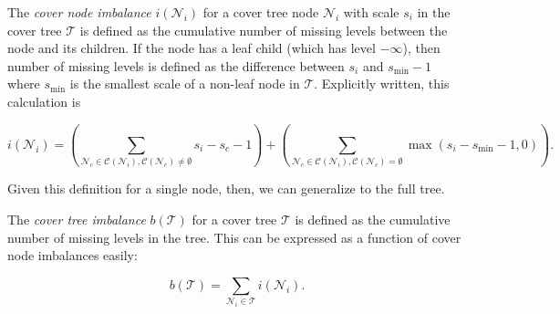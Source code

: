 \begin{defn}
The {\it cover node imbalance} $i(\mathscr{N}_i)$ for a cover tree node
$\mathscr{N}_i$ with scale $s_i$ in the cover tree $\mathscr{T}$ is defined as
the cumulative number of missing levels between the node and its children.  If
the node has a leaf child (which has level $-\infty$), then number of missing
levels is defined as the difference between $s_i$ and $s_{\min} - 1$ where
$s_{\min}$ is the smallest scale of a non-leaf node in $\mathscr{T}$.
Explicitly written, this calculation is

\begin{equation}
i(\mathscr{N}_i) = \left( \sum_{\mathscr{N}_c \in \mathscr{C}(\mathscr{N}_i),
\mathscr{C}(\mathscr{N}_c) \ne \emptyset} s_i - s_c - 1 \right) + \left(
\sum_{\mathscr{N}_c \in \mathscr{C}(\mathscr{N}_i), \mathscr{C}(\mathscr{N}_c) =
\emptyset} \max(s_i - s_{\min} - 1, 0) \right).
\end{equation}
\end{defn}

Given this definition for a single node, then, we can generalize to the full
tree.

\begin{defn}
The {\it cover tree imbalance} $b(\mathscr{T})$ for a cover tree $\mathscr{T}$
is defined as the cumulative number of missing levels in the tree.  This can be
expressed as a function of cover node imbalances easily:

\begin{equation}
b(\mathscr{T}) = \sum_{\mathscr{N}_i \in \mathscr{T}} i(\mathscr{N}_i).
\end{equation}
\end{defn}
